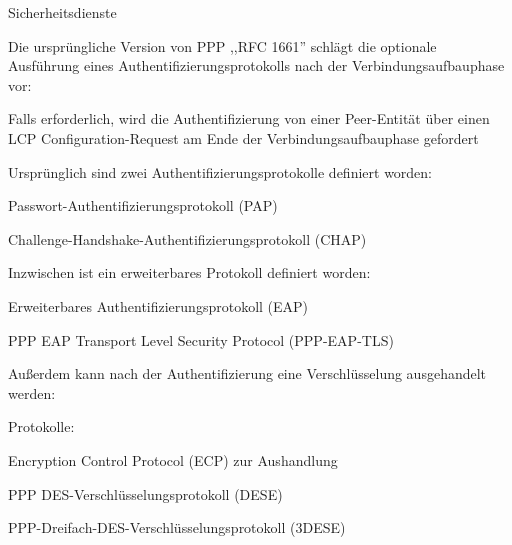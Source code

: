 \documentclass[a4paper]{article}
\begin{document}
\begin{multicols}{3}
      Sicherheitsdienste
      \begin{itemize*}
            \item Die ursprüngliche Version von PPP ,,RFC 1661'' schlägt die optionale Ausführung eines Authentifizierungsprotokolls nach der Verbindungsaufbauphase vor:
            \begin{itemize*}
                  \item Falls erforderlich, wird die Authentifizierung von einer Peer-Entität über einen LCP Configuration-Request am Ende der Verbindungsaufbauphase gefordert
                  \item Ursprünglich sind zwei Authentifizierungsprotokolle definiert worden:
                  \begin{itemize*}
                        \item Passwort-Authentifizierungsprotokoll (PAP)
                        \item Challenge-Handshake-Authentifizierungsprotokoll (CHAP)
                  \end{itemize*}
                  \item Inzwischen ist ein erweiterbares Protokoll definiert worden:
                  \begin{itemize*}
                        \item Erweiterbares Authentifizierungsprotokoll (EAP)
                        \item PPP EAP Transport Level Security Protocol (PPP-EAP-TLS)
                  \end{itemize*}
            \end{itemize*}
            \item Außerdem kann nach der Authentifizierung eine Verschlüsselung ausgehandelt werden:
            \begin{itemize*}
                  \item Protokolle:
                  \begin{itemize*}
                        \item Encryption Control Protocol (ECP) zur Aushandlung
                        \item PPP DES-Verschlüsselungsprotokoll (DESE)
                        \item PPP-Dreifach-DES-Verschlüsselungsprotokoll (3DESE)
                  \end{itemize*}
            \end{itemize*}
      \end{itemize*}


\end{multicols}
\end{document}
